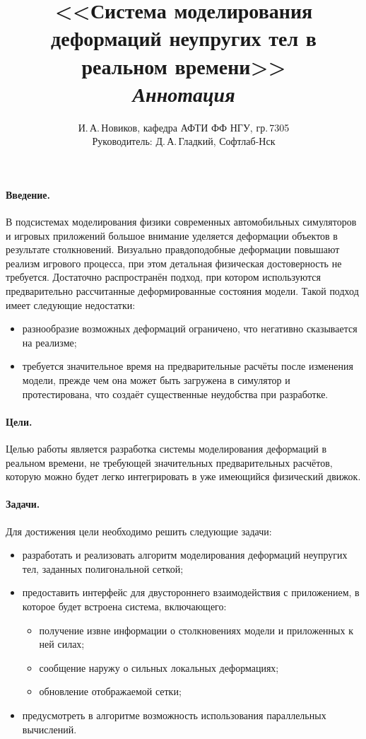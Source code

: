 \documentclass[a4paper,11pt]{article}
\author{И.\,А.\,Новиков, кафедра АФТИ ФФ НГУ, гр.\,7305\\ Руководитель: Д.\,А.\,Гладкий, Софтлаб-Нск}
\title{<<Система моделирования деформаций неупругих тел в реальном времени>>\\\itshape Аннотация}
\begin{document}
  \maketitle
  \thispagestyle{empty}
  \paragraph{Введение.}
    В подсистемах моделирования физики современных автомобильных симуляторов и игровых приложений большое внимание
    уделяется деформации объектов в результате столкновений. Визуально
    правдоподобные деформации повышают реализм игрового процесса, при этом детальная
    физическая достоверность не требуется. Достаточно распространён подход, при
    котором используются предварительно рассчитанные деформированные состояния модели.
    Такой подход имеет следующие недостатки:
    \begin{itemize}
      \item разнообразие возможных деформаций ограничено, что негативно сказывается на реализме;
      \item требуется значительное время на предварительные расчёты после изменения модели, прежде чем
        она может быть загружена в симулятор и протестирована, что создаёт существенные неудобства при разработке.
    \end{itemize}
  \paragraph{Цели.}
    Целью работы является разработка системы моделирования деформаций в реальном
    времени, не требующей значительных предварительных расчётов, которую можно будет легко
    интегрировать в уже имеющийся физический движок.
  \paragraph{Задачи.}
    Для достижения цели необходимо решить следующие задачи:
    \begin{itemize}
      \item разработать и реализовать алгоритм моделирования деформаций неупругих тел, заданных полигональной сеткой;
      \item предоставить интерфейс для двустороннего взаимодействия с приложением, в которое будет
        встроена система, включающего:
        \begin{itemize}
          \item получение извне информации о столкновениях модели и приложенных к ней силах;
          \item сообщение наружу о сильных локальных деформациях;
          \item обновление отображаемой сетки;
        \end{itemize}
      \item предусмотреть в алгоритме возможность использования параллельных вычислений.
    \end{itemize}
\end{document}
